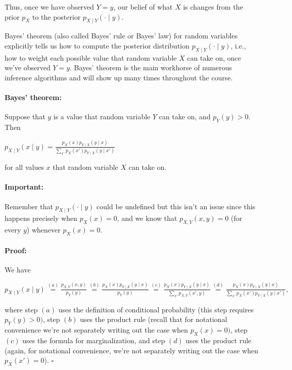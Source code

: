 \documentclass[6008notes.tex]{subfiles}
\begin{document}
Thus, once we have observed $Y=y$, our belief of what $X$ is changes from the prior $p_X$ to the posterior $p_{X\mid Y}(\cdot \mid y)$.

Bayes' theorem (also called Bayes' rule or Bayes' law) for random variables explicitly tells us how to compute the posterior distribution $p_{X\mid Y}(\cdot \mid y)$, i.e., how to weight each possible value that random variable $X$ can take on, once we've observed $Y=y$. Bayes' theorem is the main workhorse of numerous inference algorithms and will show up many times throughout the course.

\paragraph{Bayes' theorem:} Suppose that $y$ is a value that random variable $Y$ can take on, and $p_{Y}(y)>0$. Then

$p_{X\mid Y}(x\mid y)=\frac{p_{X}(x)p_{Y\mid X}(y\mid x)}{\sum _{ x'}p_{X}( x')p_{Y\mid X}(y\mid x')}$
 
for all values $x$ that random variable $X$ can take on.

\paragraph{Important:} Remember that $p_{X\mid Y}(\cdot \mid y)$ could be undefined but this isn't an issue since this happens precisely when $p_X(x)=0$, and we know that $p_{X,Y}(x,y)=0$ (for every $y$) whenever $p_X(x)=0$.

\paragraph{Proof:} We have

{\centering$p_{X\mid Y}(x\mid y)\overset {(a)}{=}\frac{p_{X,Y}(x,y)}{p_{Y}(y)}\overset {(b)}{=}\frac{p_{X}(x)p_{Y\mid X}(y\mid x)}{p_{Y}(y)}\overset {(c)}{=}\frac{p_{X}(x)p_{Y\mid X}(y\mid x)}{\sum _{ x'}p_{X,Y}( x',y)}\overset {(d)}{=}\frac{p_{X}(x)p_{Y\mid X}(y\mid x)}{\sum _{ x'}p_{X}( x')p_{Y\mid X}(y\mid x')},$ \par}
 
where step $(a)$ uses the definition of conditional probability (this step requires $p_Y(y)>0)$, step $(b)$ uses the product rule (recall that for notational convenience we're not separately writing out the case when $p_X(x)=0)$, step $(c)$ uses the formula for marginalization, and step $(d)$ uses the product rule (again, for notational convenience, we're not separately writing out the case when $p_X(x')=0$). $\square$
\end{document}
